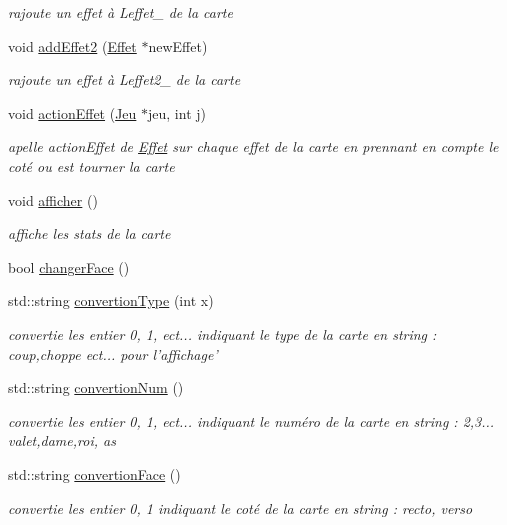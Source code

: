 \begin{DoxyCompactItemize}
\begin{DoxyCompactList}\small\item\em rajoute un effet à Leffet\-\_\- de la carte \end{DoxyCompactList}\item 
void \hyperlink{class_carte_a3f2cf87d69031210310f6b9eff20fe81}{add\-Effet2} (\hyperlink{class_effet}{Effet} $\ast$new\-Effet)
\begin{DoxyCompactList}\small\item\em rajoute un effet à Leffet2\-\_\- de la carte \end{DoxyCompactList}\item 
void \hyperlink{class_carte_a22cc2da2c3819aeadd1e09e88dfbedcf}{action\-Effet} (\hyperlink{class_jeu}{Jeu} $\ast$jeu, int j)
\begin{DoxyCompactList}\small\item\em apelle action\-Effet de \hyperlink{class_effet}{Effet} sur chaque effet de la carte en prennant en compte le coté ou est tourner la carte \end{DoxyCompactList}\item 
void \hyperlink{class_carte_a007f478e6e0efb44fb4421a94bdacf65}{afficher} ()
\begin{DoxyCompactList}\small\item\em affiche les stats de la carte \end{DoxyCompactList}\item 
bool \hyperlink{class_carte_a54e8a949b343e2c77f3ad8bbbdf0b89a}{changer\-Face} ()
\item 
std\-::string \hyperlink{class_carte_a7f41044fea15a5a73c85e9fbee83114c}{convertion\-Type} (int x)
\begin{DoxyCompactList}\small\item\em convertie les entier 0, 1, ect... indiquant le type de la carte en string \-: coup,choppe ect... pour l'affichage' \end{DoxyCompactList}\item 
std\-::string \hyperlink{class_carte_a9d6b3e60bcd0d08ce097e87ee7e70d3b}{convertion\-Num} ()
\begin{DoxyCompactList}\small\item\em convertie les entier 0, 1, ect... indiquant le numéro de la carte en string \-: 2,3... valet,dame,roi, as \end{DoxyCompactList}\item 
std\-::string \hyperlink{class_carte_a0d9210299570093ca0842df066da50f4}{convertion\-Face} ()
\begin{DoxyCompactList}\small\item\em convertie les entier 0, 1 indiquant le coté de la carte en string \-: recto, verso \end{DoxyCompactList}\item 

\end{DoxyCompactItemize}

